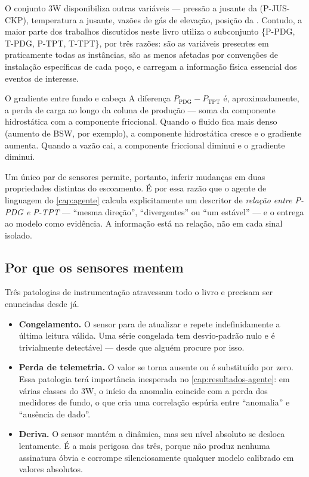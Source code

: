 O conjunto 3W disponibiliza outras variáveis --- pressão a jusante da 
(P-JUS-CKP), temperatura a jusante, vazões de gás de elevação, posição da .
Contudo, a maior parte dos trabalhos discutidos neste livro utiliza o subconjunto
\{P-PDG, T-PDG, P-TPT, T-TPT\}, por três razões: são as variáveis presentes em
praticamente todas as instâncias, são as menos afetadas por convenções de instalação
específicas de cada poço, e carregam a informação física essencial dos eventos de
interesse.

\begin{exemplo}{O gradiente entre fundo e cabeça}
A diferença $P_{\text{PDG}} - P_{\text{TPT}}$ é, aproximadamente, a perda de carga ao
longo da coluna de produção --- soma da componente hidrostática com a componente
friccional. Quando o fluido fica mais denso (aumento de BSW, por exemplo), a
componente hidrostática cresce e o gradiente aumenta. Quando a vazão cai, a componente
friccional diminui e o gradiente diminui.

Um único par de sensores permite, portanto, inferir mudanças em duas propriedades
distintas do escoamento. É por essa razão que o agente de linguagem do
\cref{cap:agente} calcula explicitamente um descritor de \emph{relação entre P-PDG e
P-TPT} --- ``mesma direção'', ``divergentes'' ou ``um estável'' --- e o entrega ao
modelo como evidência. A informação está na relação, não em cada sinal isolado.
\end{exemplo}

\subsection{Por que os sensores mentem}

Três patologias de instrumentação atravessam todo o livro e precisam ser enunciadas
desde já.

\begin{itemize}[leftmargin=*,itemsep=0.4em]
  \item \textbf{Congelamento.} O sensor para de atualizar e repete indefinidamente a
        última leitura válida. Uma série congelada tem desvio-padrão nulo e é
        trivialmente detectável --- desde que alguém procure por isso.
  \item \textbf{Perda de telemetria.} O valor se torna ausente ou é substituído por
        zero. Essa patologia terá importância inesperada no
        \cref{cap:resultados-agente}: em várias classes do 3W, o início da anomalia
        coincide com a perda dos medidores de fundo, o que cria uma correlação espúria
        entre ``anomalia'' e ``ausência de dado''.
  \item \textbf{Deriva.} O sensor mantém a dinâmica, mas seu nível absoluto se desloca
        lentamente. É a mais perigosa das três, porque não produz nenhuma assinatura
        óbvia e corrompe silenciosamente qualquer modelo calibrado em valores
        absolutos.
\end{itemize}

